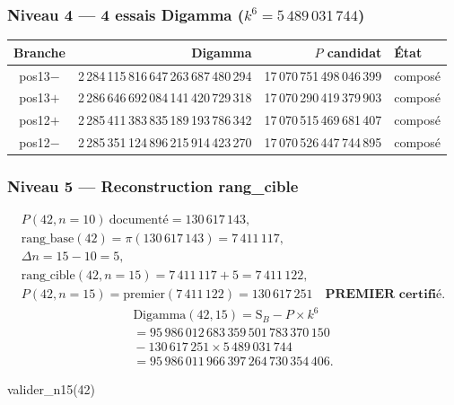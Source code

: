 \documentclass[11pt,a4paper]{article}
\newcommand{\SB}{\mathrm{S}_B}
\begin{document}
\subsubsection{Niveau 4 --- 4 essais Digamma (\texorpdfstring{$k^{6} = 5\,489\,031\,744$}{k^6 = 5,489,031,744})}
\begin{center}\small
\begin{tabular}{@{}c r r l@{}}
\toprule
\rowcolor{spectralgris}
Branche & Digamma & $P$ candidat & État \\
\midrule
pos13$-$ & 2\,284\,115\,816\,647\,263\,687\,480\,294 & 17\,070\,751\,498\,046\,399 & composé \\
pos13$+$ & 2\,286\,646\,692\,084\,141\,420\,729\,318 & 17\,070\,290\,419\,379\,903 & composé \\
pos12$+$ & 2\,285\,411\,383\,835\,189\,193\,786\,342 & 17\,070\,515\,469\,681\,407 & composé \\
pos12$-$ & 2\,285\,351\,124\,896\,215\,914\,423\,270 & 17\,070\,526\,447\,744\,895 & composé \\
\bottomrule
\end{tabular}
\end{center}

\subsubsection{Niveau 5 --- Reconstruction rang\_cible}
\begin{gather*}
P(42,n{=}10)\ \text{documenté}=130\,617\,143,\\
\text{rang\_base}(42)=\pi(130\,617\,143)=7\,411\,117,\\
\Delta n=15-10=5,\\
\text{rang\_cible}(42,n{=}15)=7\,411\,117+5=7\,411\,122,\\
P(42,n{=}15)=\text{premier}(7\,411\,122)=130\,617\,251
\quad\textbf{PREMIER certifié}.
\end{gather*}
\begin{multline*}
\text{Digamma}(42,15)=\SB-P\times k^{6}\\
=95\,986\,012\,683\,359\,501\,783\,370\,150\\
{}-130\,617\,251\times5\,489\,031\,744\\
=95\,986\,011\,966\,397\,264\,730\,354\,406.
\end{multline*}

\begin{pycode}
valider_n15(42)
\end{pycode}
\end{document}
